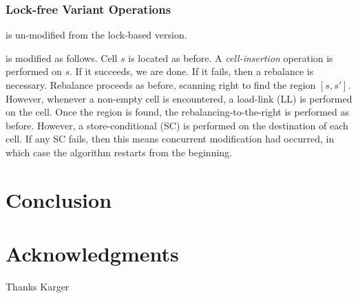 \documentclass{style}
\begin{document}
\subsubsection{Lock-free Variant Operations}

\Search{} is un-modified from the lock-based version.

\Insert{} is modified as follows. Cell $s$ is located as before. A
\textit{cell-insertion} operation is performed on $s$. If it succeeds, we are
done. If it fails, then a rebalance is necessary. Rebalance proceeds as before,
scanning right to find the region $[s, s']$. However, whenever a non-empty cell
is encountered, a load-link (LL) is performed on the cell.  Once the region is
found, the rebalancing-to-the-right is performed as before.  However, a
store-conditional (SC) is performed on the destination of each cell.  If any SC
fails, then this means concurrent modification had occurred, in which case the
algorithm restarts from the beginning.

\section{Conclusion}


\section{Acknowledgments}
Thanks Karger

%



\end{document}
